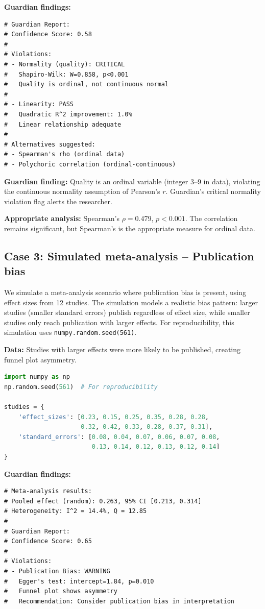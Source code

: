 \documentclass[article]{jss}
\begin{document}
\textbf{Guardian findings:}

\begin{lstlisting}
# Guardian Report:
# Confidence Score: 0.58
#
# Violations:
# - Normality (quality): CRITICAL
#   Shapiro-Wilk: W=0.858, p<0.001
#   Quality is ordinal, not continuous normal
#
# - Linearity: PASS
#   Quadratic R^2 improvement: 1.0%
#   Linear relationship adequate
#
# Alternatives suggested:
# - Spearman's rho (ordinal data)
# - Polychoric correlation (ordinal-continuous)
\end{lstlisting}

\textbf{Guardian finding:} Quality is an ordinal variable (integer 3--9 in data), violating the continuous normality assumption of Pearson's $r$. Guardian's critical normality violation flag alerts the researcher.

\textbf{Appropriate analysis:} Spearman's $\rho = 0.479$, $p < 0.001$. The correlation remains significant, but Spearman's is the appropriate measure for ordinal data.

\subsection{Case 3: Simulated meta-analysis -- Publication bias}

We simulate a meta-analysis scenario where publication bias is present, using effect sizes from 12 studies. The simulation models a realistic bias pattern: larger studies (smaller standard errors) publish regardless of effect size, while smaller studies only reach publication with larger effects. For reproducibility, this simulation uses \texttt{numpy.random.seed(561)}.

\textbf{Data:} Studies with larger effects were more likely to be published, creating funnel plot asymmetry.

\begin{lstlisting}[language=Python]
import numpy as np
np.random.seed(561)  # For reproducibility

studies = {
    'effect_sizes': [0.23, 0.15, 0.25, 0.35, 0.28, 0.28,
                     0.32, 0.42, 0.33, 0.28, 0.37, 0.31],
    'standard_errors': [0.08, 0.04, 0.07, 0.06, 0.07, 0.08,
                        0.13, 0.14, 0.12, 0.13, 0.12, 0.14]
}
\end{lstlisting}

\textbf{Guardian findings:}

\begin{lstlisting}
# Meta-analysis results:
# Pooled effect (random): 0.263, 95% CI [0.213, 0.314]
# Heterogeneity: I^2 = 14.4%, Q = 12.85
#
# Guardian Report:
# Confidence Score: 0.65
#
# Violations:
# - Publication Bias: WARNING
#   Egger's test: intercept=1.84, p=0.010
#   Funnel plot shows asymmetry
#   Recommendation: Consider publication bias in interpretation
\end{lstlisting}
\end{document}
